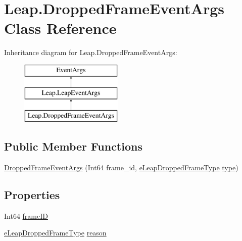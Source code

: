 \hypertarget{class_leap_1_1_dropped_frame_event_args}{}\section{Leap.\+Dropped\+Frame\+Event\+Args Class Reference}
\label{class_leap_1_1_dropped_frame_event_args}
Inheritance diagram for Leap.\+Dropped\+Frame\+Event\+Args\+:\begin{figure}[H]
\begin{center}
\leavevmode
\includegraphics[height=3.000000cm]{class_leap_1_1_dropped_frame_event_args}
\end{center}
\end{figure}
\subsection*{Public Member Functions}
\begin{DoxyCompactItemize}
\item 
\mbox{\hyperlink{class_leap_1_1_dropped_frame_event_args_aa4561f67dfb5dbd521c42e027a95eed0}{Dropped\+Frame\+Event\+Args}} (Int64 frame\+\_\+id, \mbox{\hyperlink{namespace_leap_internal_af32f98bc0f7257d572aa3f3c3dac43a3}{e\+Leap\+Dropped\+Frame\+Type}} \mbox{\hyperlink{class_leap_1_1_leap_event_args_ad6b72c7eb6588be538cd1f149ffcc355}{type}})
\end{DoxyCompactItemize}
\subsection*{Properties}
\begin{DoxyCompactItemize}
\item 
Int64 \mbox{\hyperlink{class_leap_1_1_dropped_frame_event_args_afc68d607a7839f8e76ad0027148bf803}{frame\+ID}}
\item 
\mbox{\hyperlink{namespace_leap_internal_af32f98bc0f7257d572aa3f3c3dac43a3}{e\+Leap\+Dropped\+Frame\+Type}} \mbox{\hyperlink{class_leap_1_1_dropped_frame_event_args_a4c5452cab63ac4cb05be737edb54f5e6}{reason}}
\end{DoxyCompactItemize}


